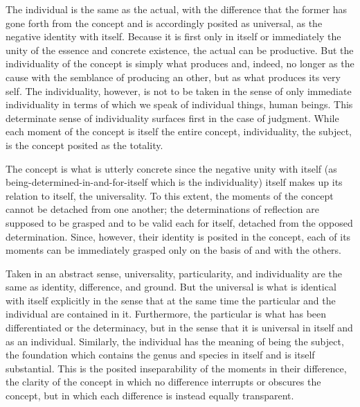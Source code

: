 The individual is the same as the actual,
with the difference that the former has
gone forth from the concept
and is accordingly posited as universal,
as the negative identity with itself.
Because it is first only in itself
or immediately the unity of
the essence and concrete existence,
the actual can be productive.
But the individuality of the concept is
simply what produces and, indeed,
no longer as the cause with
the semblance of producing an other,
but as what produces its very self.
The individuality, however, is
not to be taken in the sense of
only immediate individuality in terms of which
we speak of individual things, human beings.
This determinate sense of individuality
surfaces first in the case of judgment.
While each moment of the concept is
itself the entire concept,
individuality, the subject, is
the concept posited as the totality.

The concept is what is utterly concrete
since the negative unity with itself
(as being-determined-in-and-for-itself
which is the individuality)
itself makes up its relation to itself, the universality.
To this extent, the moments of the concept
cannot be detached from one another;
the determinations of reflection are supposed
to be grasped and to be valid each for itself,
detached from the opposed determination.
Since, however, their identity is posited in the concept,
each of its moments can be immediately grasped only
on the basis of and with the others.

Taken in an abstract sense,
universality, particularity, and individuality
are the same as identity, difference, and ground.
But the universal is what is identical with itself
explicitly in the sense that at the same time
the particular and the individual are contained in it.
Furthermore, the particular is what has been
differentiated or the determinacy,
but in the sense that it is
universal in itself and as an individual.
Similarly, the individual has
the meaning of being the subject,
the foundation which contains
the genus and species in itself
and is itself substantial.
This is the posited inseparability of
the moments in their difference,
the clarity of the concept in which
no difference interrupts or obscures the concept,
but in which each difference is instead equally transparent.


